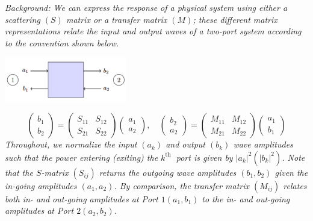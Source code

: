 \documentclass[hyperref, a4paper]{article}
\begin{document}
\textit{Background: We can express the response of a physical system using either a scattering $(S)$ matrix or a transfer matrix $(M)$; these different matrix representations relate the input and output waves of a two-port system according to the convention shown below.
}
\begin{center}
    \includegraphics[width=0.4\textwidth]{figs/two-port.PNG}
\end{center}
$$
\left(\begin{array}{l}
b_1 \\
b_2
\end{array}\right)=\left(\begin{array}{ll}
S_{11} & S_{12} \\
S_{21} & S_{22}
\end{array}\right)\left(\begin{array}{l}
a_1 \\
a_2
\end{array}\right), \quad\left(\begin{array}{l}
b_2 \\
a_2
\end{array}\right)=\left(\begin{array}{ll}
M_{11} & M_{12} \\
M_{21} & M_{22}
\end{array}\right)\left(\begin{array}{l}
a_1 \\
b_1
\end{array}\right)
$$
\textit{Throughout, we normalize the input $\left(a_k\right)$ and output $\left(b_k\right)$ wave amplitudes such that the power entering (exiting) the $k^{\text {th }}$ port is given by $\left|a_k\right|^2\left(\left|b_k\right|^2\right)$. Note that the $S$-matrix $\left(S_{i j}\right)$ returns the outgoing wave amplitudes $\left(b_1, b_2\right)$ given the in-going amplitudes $\left(a_1, a_2\right)$. By comparison, the transfer matrix $\left(M_{i j}\right)$ relates both in- and out-going amplitudes at Port $1\left(a_1, b_1\right)$ to the in- and out-going amplitudes at Port $2\left(a_2, b_2\right)$.
}

\subsection{}
\end{document}
